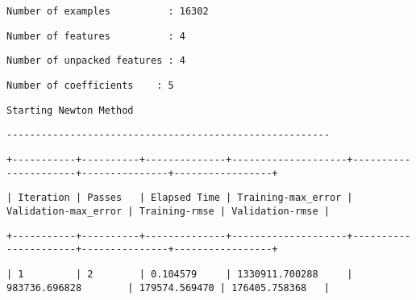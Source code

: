 \documentclass[11pt]{article}
\begin{document}
    \begin{verbatim}
Number of examples          : 16302
    \end{verbatim}

    
    
    \begin{verbatim}
Number of features          : 4
    \end{verbatim}

    
    
    \begin{verbatim}
Number of unpacked features : 4
    \end{verbatim}

    
    
    \begin{verbatim}
Number of coefficients    : 5
    \end{verbatim}

    
    
    \begin{verbatim}
Starting Newton Method
    \end{verbatim}

    
    
    \begin{verbatim}
--------------------------------------------------------
    \end{verbatim}

    
    
    \begin{verbatim}
+-----------+----------+--------------+--------------------+----------------------+---------------+-----------------+
    \end{verbatim}

    
    
    \begin{verbatim}
| Iteration | Passes   | Elapsed Time | Training-max_error | Validation-max_error | Training-rmse | Validation-rmse |
    \end{verbatim}

    
    
    \begin{verbatim}
+-----------+----------+--------------+--------------------+----------------------+---------------+-----------------+
    \end{verbatim}

    
    
    \begin{verbatim}
| 1         | 2        | 0.104579     | 1330911.700288     | 983736.696828        | 179574.569470 | 176405.758368   |
    \end{verbatim}
\end{document}
